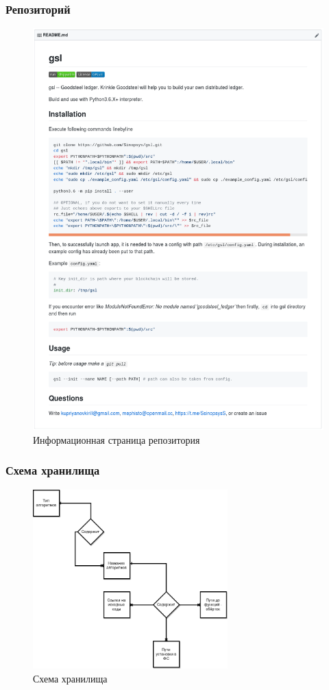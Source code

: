 \documentclass{beamer}
\begin{document}
\begin{frame}
    \frametitle{Репозиторий}
    \begin{figure}
        \centering
        \includegraphics[height=0.7\textheight]{repo}
        \caption{\small Информационная страница репозитория}
    \end{figure}
\end{frame}

\begin{frame}
    \frametitle{Схема хранилища}
    \begin{figure}
        \centering
        \includegraphics[width=0.67\textwidth]{db}
        \caption{Схема хранилища}
    \end{figure}
\end{frame}
\end{document}
